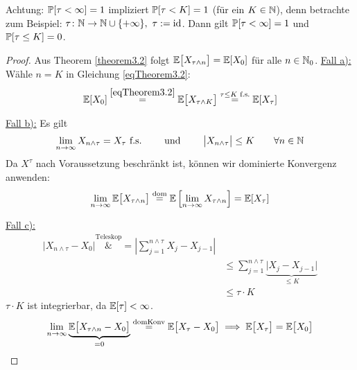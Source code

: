 \begin{bemerkung} %
	Achtung: $\P[\tau<\infty]=1$ impliziert  $\P[\tau<K]=1$ (für ein $K\in\N$), 
	denn betrachte zum Beispiel: $\tau\colon\N\to\N\cup\lbrace+\infty\rbrace,~\tau:=\id$.
	Dann gilt $\P[\tau<\infty]=1$ und $\P[\tau\leq K]=0$.	
\end{bemerkung}

\begin{proof}
	Aus Theorem \ref{theorem3.2} folgt $\E\big[X_{\tau\wedge n}\big]=\E[X_0]$ für alle $n\in\N_0$.\nl
	\underline{Fall a):}\\
	Wähle $n=K$ in Gleichung \eqref{eqTheorem3.2}:
	\begin{align*}
		\E[X_0]\overset{\eqref{eqTheorem3.2}}{=}\E\big[X_{\tau\wedge K}\big]\stackeq{\tau\leq K\text{ f.s.}}\E[X_\tau]
	\end{align*}

	\underline{Fall b):} Es gilt
	\begin{align*}
		\limn X_{n\wedge\tau}=X_\tau\text{ f.s.}
		\qquad\und\qquad
		\big| X_{n\wedge\tau}\big|\leq K\qquad\forall n\in\N
	\end{align*}
	Da $X^\tau$ nach Voraussetzung beschränkt ist, können wir dominierte Konvergenz anwenden:
	\begin{align*}
		\limn\E\big[X_{\tau\wedge n}\big]\stackeq{\text{dom}}\E\left[\limn X_{\tau\wedge n}\right]=\E[X_\tau]
	\end{align*}

	\underline{Fall c):}
	\begin{align*}
		\big| X_{n\wedge\tau}-X_0\big|
		\overset{\text{Teleskop}}&=
		\left|\sum\limits_{j=1}^{n\wedge\tau} X_j-X_{j-1}\right|\\
		&\leq\sum\limits_{j=1}^{n\wedge\tau} \underbrace{\big|X_j-X_{j-1}\big|}_{\leq K}\\
		&\leq\tau\cdot K
	\end{align*}
	$\tau\cdot K$ ist integrierbar, da $\E[\tau]<\infty$.
	\begin{align*}
		\limn\underbrace{\E\big[X_{\tau\wedge n}-X_0\big]}_{=0}\stackeq{\text{domKonv}}\E\big[X_\tau-X_0\big]
		\implies
		\E\big[X_\tau\big]=\E\big[X_0\big]
	\end{align*}
\end{proof}

